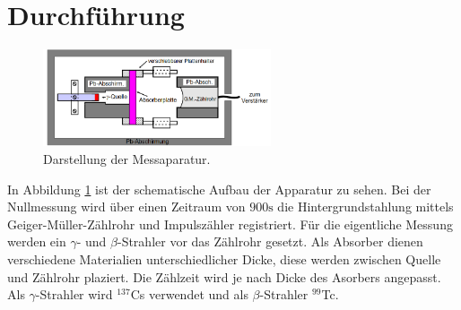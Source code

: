 \section{Durchführung}
\label{sec:Durchführung}
\begin{figure}
  \centering
  \includegraphics[width=0.6\textwidth]{aufbau.PNG}
  \caption{Darstellung der Messaparatur.\cite{sample}}
  \label{fig:aufbau}
\end{figure}
In Abbildung \ref{fig:aufbau} ist der schematische Aufbau der Apparatur zu sehen.
Bei der Nullmessung wird über einen Zeitraum von $900\si{\second}$ die Hintergrundstahlung mittels
Geiger-Müller-Zählrohr und Impulszähler registriert.
Für die eigentliche Messung werden ein $\gamma$- und $\beta$-Strahler vor das Zählrohr gesetzt. Als Absorber
dienen verschiedene Materialien unterschiedlicher Dicke, diese werden zwischen Quelle und Zählrohr plaziert.
Die Zählzeit wird je nach Dicke des Asorbers angepasst.
Als $\gamma$-Strahler wird $^{137}$Cs verwendet und als $\beta$-Strahler $^{99}$Tc.
